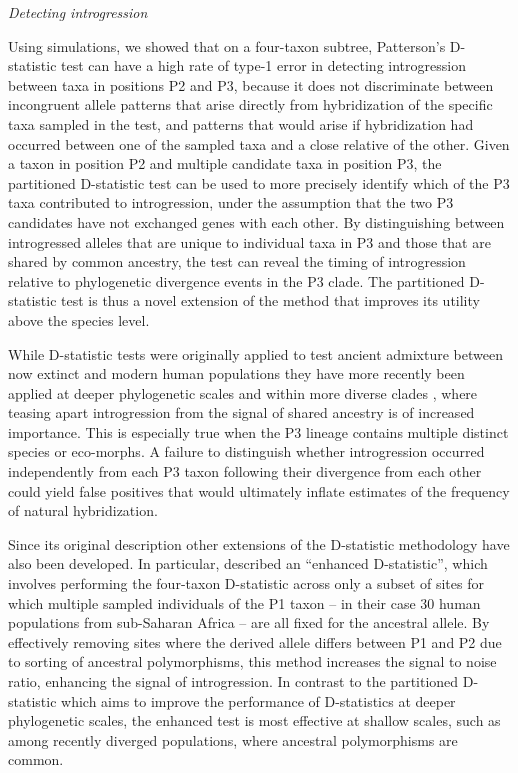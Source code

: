 \documentclass[12pt,letterpaper]{article}
\renewcommand{\subsection}[1]{%
\bigskip
\begin{center}
\begin{large}
\normalfont\itshape #1
\end{large}
\end{center}}
\begin{document}
\subsection{Detecting introgression}
Using simulations, we showed that on a four-taxon subtree, Patterson's
D-statistic test can have a high rate of type-1 error in detecting
introgression between taxa in positions P2 and P3, because it does not
discriminate between incongruent allele patterns that arise directly
from hybridization of the specific taxa sampled in the test, and
patterns that would arise if hybridization had occurred between one of
the sampled taxa and a close relative of the other.
Given a taxon in position P2 and multiple candidate taxa in position
P3, the partitioned D-statistic test can be used to more precisely
identify which of the P3 taxa contributed to introgression, 
under the assumption that the two P3 candidates have 
not exchanged genes with each other.
By distinguishing between introgressed alleles that are
unique to individual taxa in P3 and
those that are shared by common ancestry, the test can reveal the
timing of introgression relative to phylogenetic divergence events in
the P3 clade. The partitioned D-statistic test is thus a novel
extension of the method that improves its utility above the species
level.

While D-statistic tests were originally applied to test ancient  
admixture between now extinct and modern human populations \citep{green_draft_2010, 
skoglund_archaic_2011,meyer_high-coverage_2012} they have more recently been applied 
at deeper phylogenetic scales and within more diverse clades \citep{the_heliconius_genome_consortium_butterfly_2012},
where teasing apart introgression from the signal of shared ancestry is
of increased importance. 
This is especially true when the P3 lineage contains multiple distinct 
species or eco-morphs. A failure to distinguish whether introgression 
occurred independently from each P3 taxon following their divergence from each other 
could yield false positives that would ultimately inflate estimates
of the frequency of natural hybridization.

Since its original description other extensions of the D-statistic 
methodology have also been developed.
In particular, \cite{meyer_high-coverage_2012} 
described an ``enhanced D-statistic'', which involves performing the four-taxon 
D-statistic across only a subset of sites for which multiple sampled individuals 
of the P1 taxon -- in their case 30 human populations from sub-Saharan Africa
-- are all fixed for the ancestral allele. By effectively removing sites 
where the derived allele differs between P1 and P2 due to sorting of ancestral 
polymorphisms, this method increases the signal to noise ratio, 
enhancing the signal of introgression. 
In contrast to the partitioned D-statistic which aims to improve
the performance of D-statistics at deeper phylogenetic scales, the
enhanced test is most effective at shallow scales, such as among 
recently diverged populations, where ancestral polymorphisms are common. 
\end{document}
